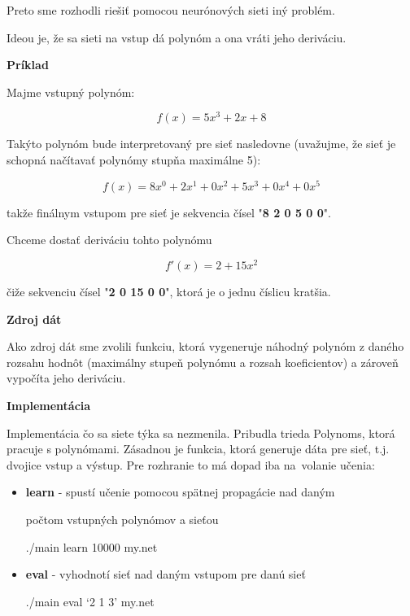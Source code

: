\documentclass[12pt]{article}
\newcommand{\mysmallsection}[1]{\vspace{0.5cm}{\centering\large\textbf{#1}\\}\normalsize\vspace{0.5cm}}
\begin{document}
Preto sme rozhodli riešiť pomocou neurónových sieti iný problém.

\newpage
\mysmallsection{Problém derivácie polynómu}

Ideou je, že sa sieti na vstup dá polynóm a ona vráti jeho deriváciu. 

{\vspace*{0.5cm}\centering\textbf{Príklad}\\}

Majme vstupný polynóm:

\begin{equation}
f(x)=5x^3 + 2x + 8
\end{equation}

Takýto polynóm bude interpretovaný pre sieť nasledovne (uvažujme, že sieť je schopná načítavať polynómy stupňa maximálne 5):

\begin{equation}
f(x)=8x^0 + 2x^1 + 0x^2 + 5x^3 + 0x^4 + 0x^5
\end{equation}

\noindent takže finálnym vstupom pre sieť je sekvencia čísel "\textbf{8 2 0 5 0 0}".

Chceme dostať deriváciu tohto polynómu

\begin{equation}
f'(x)=2 + 15x^2
\end{equation}

\noindent čiže sekvenciu čísel "\textbf{2 0 15 0 0}", ktorá je o jednu číslicu kratšia.

{\vspace*{0.5cm}\centering\textbf{Zdroj dát}\\}

Ako zdroj dát sme zvolili funkciu, ktorá vygeneruje náhodný polynóm z daného rozsahu hodnôt (maximálny stupeň polynómu a rozsah koeficientov) a zároveň vypočíta jeho deriváciu. 

{\vspace*{0.5cm}\centering\textbf{Implementácia}\\}

Implementácia čo sa siete týka sa nezmenila. Pribudla trieda Polynoms, ktorá pracuje s polynómami. Zásadnou je funkcia, ktorá generuje dáta pre sieť, t.j. dvojice vstup a výstup. Pre rozhranie to má dopad iba na~volanie učenia:

\begin{itemize}
\item \textbf{learn} - spustí učenie pomocou spätnej propagácie nad daným

\hspace{1.2cm} počtom vstupných polynómov a sieťou

{\centering\small ./main learn 10000 my.net \\}

\item \textbf{eval} - vyhodnotí sieť nad daným vstupom pre danú sieť

{\centering\small ./main eval `2 1 3' my.net \\}

\end{itemize}
\end{document}
